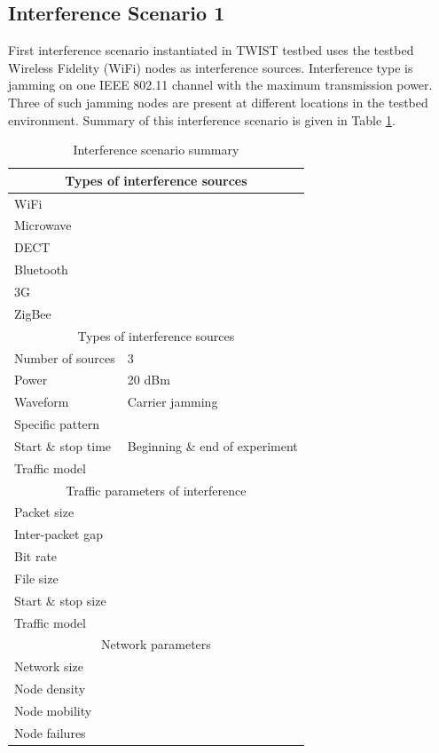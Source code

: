 \documentclass[11pt,a4paper,headinclude,footinclude,chapterprefix=on]{scrreprt}
\begin{document}
\subsection{Interference Scenario 1} First interference scenario instantiated in TWIST testbed uses the testbed Wireless Fidelity (WiFi) nodes as interference sources. Interference type is jamming on one IEEE 802.11 channel with the maximum transmission power. Three of such jamming nodes are present at different locations in the testbed environment. Summary of this interference scenario is given in Table \ref{tb:interf:1}.
\begin{table}
	[h] \centering \caption{Interference scenario summary} \label{tb:interf:1} 
	\begin{tabular}
		{|l|l|} \hline \multicolumn{2}{|c|}{Types of interference sources} \\
		\hline WiFi & \checkmark \\
		Microwave & \texttimes \\
		DECT & \texttimes \\
		Bluetooth & \texttimes \\
		3G & \texttimes \\
		ZigBee & \texttimes \\
		\hline \multicolumn{2}{|c|}{Types of interference sources} \\
		\hline Number of sources & 3 \\
		Power & 20 dBm \\
		Waveform & Carrier jamming \\
		Specific pattern & \\
		Start \& stop time & Beginning \& end of experiment \\
		Traffic model & \\
		\hline \multicolumn{2}{|c|}{Traffic parameters of interference} \\
		\hline Packet size & \\
		Inter-packet gap & \\
		Bit rate & \\
		File size & \\
		Start \& stop size & \\
		Traffic model & \\
		\hline \multicolumn{2}{|c|}{Network parameters} \\
		\hline Network size & \\
		Node density & \\
		Node mobility & \\
		Node failures & \\
		\hline 
	\end{tabular}
\end{table}
\end{document}

